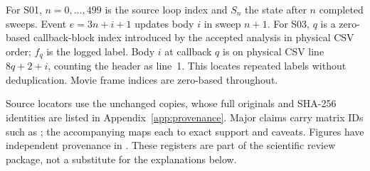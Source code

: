 For S01, $n=0,\ldots,499$ is the source loop index and $S_n$ the state after
$n$ completed sweeps. Event $e=3n+i+1$ updates body $i$ in sweep $n+1$.
For S03, $q$ is a zero-based callback-block index introduced by the accepted
analysis in physical CSV order; $f_q$ is the logged  label.
Body $i$ at callback $q$ is on physical CSV line $8q+2+i$, counting the header
as line~1. This locates repeated labels without deduplication. Movie frame
indices are zero-based throughout. 

Source locators use the unchanged copies, whose full originals and SHA-256
identities are listed in Appendix~\ref{app:provenance}. Major claims carry
matrix IDs such as ; the accompanying
 maps each to exact support and caveats.
Figures have independent provenance in
. These registers are part of the
scientific review package, not a substitute for the explanations below.
